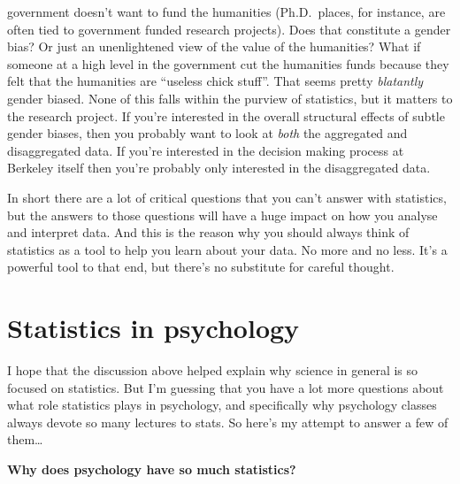 \documentclass[
  letterpaper,
]{book}
\begin{document}
government doesn't want to fund the humanities (Ph.D.~places, for
instance, are often tied to government funded research projects). Does
that constitute a gender bias? Or just an unenlightened view of the
value of the humanities? What if someone at a high level in the
government cut the humanities funds because they felt that the
humanities are ``useless chick stuff''. That seems pretty
\emph{blatantly} gender biased. None of this falls within the purview of
statistics, but it matters to the research project. If you're interested
in the overall structural effects of subtle gender biases, then you
probably want to look at \emph{both} the aggregated and disaggregated
data. If you're interested in the decision making process at Berkeley
itself then you're probably only interested in the disaggregated data.

In short there are a lot of critical questions that you can't answer
with statistics, but the answers to those questions will have a huge
impact on how you analyse and interpret data. And this is the reason why
you should always think of statistics as a tool to help you learn about
your data. No more and no less. It's a powerful tool to that end, but
there's no substitute for careful thought.

\hypertarget{statistics-in-psychology}{%
\section{Statistics in psychology}\label{statistics-in-psychology}}

I hope that the discussion above helped explain why science in general
is so focused on statistics. But I'm guessing that you have a lot more
questions about what role statistics plays in psychology, and
specifically why psychology classes always devote so many lectures to
stats. So here's my attempt to answer a few of them\ldots{}

\textbf{Why does psychology have so much statistics?}
\end{document}
